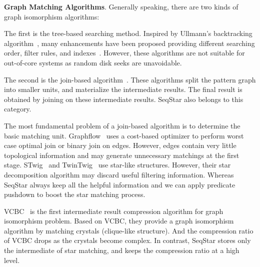 \textbf{Graph Matching Algorithms}.
Generally speaking, there are two kinds of graph isomorphism algorithms:

The first is the tree-based searching method.
Inspired by Ullmann's backtracking algorithm~\cite{DBLP:journals/jacm/Ullmann76},
many enhancements have been proposed providing different searching order, filter rules, and indexes~\cite{DBLP:journals/pami/CordellaFSV04,DBLP:journals/pvldb/ShangZLY08,DBLP:conf/sigmod/HeS08,DBLP:conf/sigmod/HanLL13,DBLP:journals/pvldb/LeeHKL12}.
However, these algorithms are not suitable for out-of-core systems as random disk seeks are unavoidable.

The second is the join-based algorithm~\cite{DBLP:journals/pvldb/LaiQLC15,DBLP:journals/pvldb/QiaoZC17,DBLP:journals/pvldb/SunWWSL12,DBLP:journals/pvldb/MhedhbiS19,DBLP:journals/pvldb/MhedhbiS19}.
These algorithms split the pattern graph into smaller units,
and materialize the intermediate results.
The final result is obtained by joining on these intermediate results.
SeqStar also belongs to this category.

The most fundamental problem of a join-based algorithm is to determine the basic matching unit.
Graphflow~\cite{DBLP:journals/pvldb/MhedhbiS19} uses a cost-based optimizer to perform worst case optimal join or binary join on edges.
However, edges contain very little topological information and may generate unnecessary matchings at the first stage.
STwig~\cite{DBLP:journals/pvldb/SunWWSL12} and TwinTwig~\cite{DBLP:journals/pvldb/LaiQLC15} use star-like structures.
However, their star decomposition algorithm may discard useful filtering information.
Whereas SeqStar always keep all the helpful information and we can apply predicate pushdown to boost the star matching process.

VCBC~\cite{DBLP:journals/pvldb/QiaoZC17} is the first intermediate result compression algorithm for graph isomorphism problem.
Based on VCBC, they provide a graph isomorphism algorithm by matching crystals (clique-like structure).
And the compression ratio of VCBC drops as the crystals become complex.
In contrast, SeqStar stores only the intermediate of star matching, and keeps the compression ratio at a high level.

